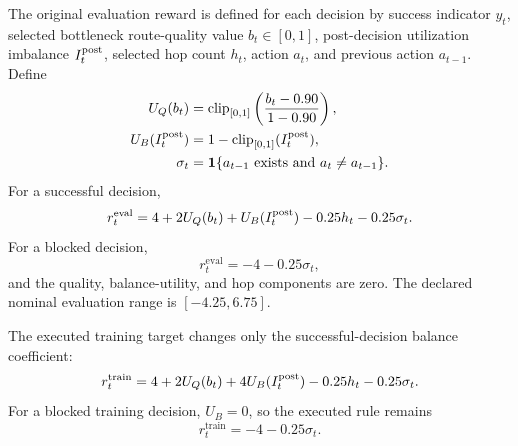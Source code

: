The original evaluation reward is defined for each decision by success indicator
$y_t$, selected bottleneck route-quality value $b_t\in[0,1]$, post-decision
utilization imbalance $I_t^{\rm post}$, selected hop count $h_t$, action $a_t$, and
previous action $a_{t-1}$. Define
\begin{align}
U_Q(b_t)&=\operatorname{clip}_{[0,1]}
\left(\frac{b_t-0.90}{1-0.90}\right),\\
U_B(I_t^{\rm post})&=1-\operatorname{clip}_{[0,1]}(I_t^{\rm post}),\\
\sigma_t&=\mathbf 1\{a_{t-1}\ \text{exists and }a_t\ne a_{t-1}\}.
\end{align}
For a successful decision,
\begin{equation}
r_t^{\mathrm{eval}}=4+2U_Q(b_t)+U_B(I_t^{\rm post})-0.25h_t-0.25\sigma_t.
\label{eq:success-reward}
\end{equation}
For a blocked decision,
\begin{equation}
r_t^{\mathrm{eval}}=-4-0.25\sigma_t,
\label{eq:block-reward}
\end{equation}
and the quality, balance-utility, and hop components are zero. The declared nominal
evaluation range is $[-4.25,6.75]$.

The executed training target changes only the successful-decision balance
coefficient:
\begin{equation}
r_t^{\mathrm{train}}=4+2U_Q(b_t)+4U_B(I_t^{\rm post})
-0.25h_t-0.25\sigma_t.
\label{eq:success-training-reward}
\end{equation}
For a blocked training decision, $U_B=0$, so the executed rule remains
\begin{equation}
r_t^{\mathrm{train}}=-4-0.25\sigma_t.
\label{eq:block-training-reward}
\end{equation}

